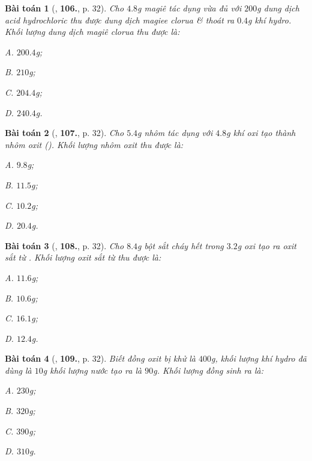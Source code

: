 \documentclass{article}
\numberwithin{equation}{section}
\newtheorem{baitoan}{Bài toán}[section]
\begin{document}
\begin{baitoan}[\cite{An2011}, \textbf{106.}, p. 32]
	Cho $4.8$g magiê tác dụng vừa đủ với $200$g dung dịch acid hydrochloric thu được dung dịch magiee clorua \& thoát ra $0.4$g khí hydro. Khối lượng dung dịch magiê clorua thu được là:
	\begin{enumerate*}
		\item[{\rm\sf A.}] $200.4$g;
		\item[{\rm\sf B.}] $210$g;
		\item[{\rm\sf C.}] $204.4$g;
		\item[{\rm\sf D.}] $240.4$g.
	\end{enumerate*}
\end{baitoan}

\begin{baitoan}[\cite{An2011}, \textbf{107.}, p. 32]
	Cho $5.4$g nhôm tác dụng với $4.8$g khí oxi tạo thành nhôm oxit (). Khối lượng nhôm oxit thu được là:
	\begin{enumerate*}
		\item[{\rm\sf A.}] $9.8$g;
		\item[{\rm\sf B.}] $11.5$g;
		\item[{\rm\sf C.}] $10.2$g;
		\item[{\rm\sf D.}] $20.4$g.
	\end{enumerate*}
\end{baitoan}

\begin{baitoan}[\cite{An2011}, \textbf{108.}, p. 32]
	Cho $8.4$g bột sắt cháy hết trong $3.2$g oxi tạo ra oxit sắt từ . Khối lượng oxit sắt từ thu được là:
	\begin{enumerate*}
		\item[{\rm\sf A.}] $11.6$g;
		\item[{\rm\sf B.}] $10.6$g;
		\item[{\rm\sf C.}] $16.1$g;
		\item[{\rm\sf D.}] $12.4$g.
	\end{enumerate*}
\end{baitoan}

\begin{baitoan}[\cite{An2011}, \textbf{109.}, p. 32]
	Biết đồng oxit  bị khử là $400$g, khối lượng khí hydro đã dùng là $10$g khối lượng nước tạo ra là $90$g. Khối lượng đồng sinh ra là:
	\begin{enumerate*}
		\item[{\rm\sf A.}] $230$g;
		\item[{\rm\sf B.}] $320$g;
		\item[{\rm\sf C.}] $390$g;
		\item[{\rm\sf D.}] $310$g.
	\end{enumerate*}
\end{baitoan}
\end{document}
